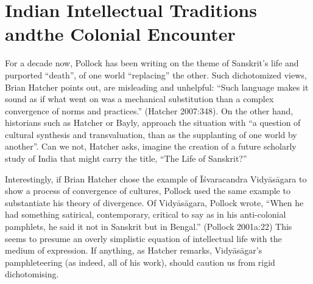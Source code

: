 \section{Indian Intellectual Traditions and\hfill\break the Colonial Encounter}%

For a decade now, Pollock has been writing on the theme of Sanskrit’s life and purported “death”, of one world “replacing” the other. Such dichotomized views, Brian Hatcher points out, are misleading and unhelpful: “Such language makes it sound as if what went on was a mechanical substitution than a complex convergence of norms and practices.” (Hatcher 2007:348). On the other hand, historians such as Hatcher or Bayly, approach the situation with “a question of cultural synthesis and transvaluation, than as the supplanting of one world by another”. Can we not, Hatcher asks, imagine the creation of a future scholarly study of India that might carry the title, “The Life of Sanskrit?”  

Interestingly, if  Brian Hatcher chose the example of Īśvaracandra Vidyāsāgara to show a process of convergence of cultures, Pollock used the same example to substantiate his theory of divergence. Of Vidyāsāgara, Pollock wrote, “When he had something satirical, contemporary, critical to say as in his anti-colonial pamphlets, he said it not in Sanskrit but in Bengal.” (Pollock 2001a:22) This seems to presume an overly simplistic equation of intellectual life with the medium of expression. If anything, as Hatcher remarks, Vidyāsāgar’s pamphleteering (as indeed, all of his work), should caution us from rigid dichotomising.

